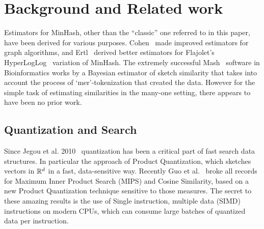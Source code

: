
\section{Background and Related work}

Estimators for MinHash, other than the ``classic'' one referred to in this paper, have been derived for various purposes.
Cohen~\cite{DBLP:reference/algo/Cohen16b} made improved estimators for graph algorithms,
and Ertl~\cite{DBLP:journals/corr/Ertl17} derived better estimators for Flajolet's HyperLogLog~\cite{flajolet1985probabilistic} variation of MinHash.
%
The extremely successful Mash~\cite{ondov2016mash} software in Bioinformatics works by
a Bayesian estimator of sketch similarity that takes into account the process of `mer'-tokenization that created the data.
However for the simple task of estimating similarities in the many-one setting, there appears to have been no prior work.






\subsection{Quantization and Search}

Since Jegou et al. 2010~\cite{jegou2010product} quantization has been a critical part of fast search data structures.
In particular the approach of Product Quantization, which sketches vectors in $\mathbb{R}^d$ in a fast, data-sensitive way.
Recently Guo et al.~\cite{guo2020accelerating} broke all records~\cite{aumuller2017ann} for Maximum Inner Product Search (MIPS) and Cosine Similarity, based on a new Product Quantization technique sensitive to those measures.
The secret to these amazing results is the use of Single instruction, multiple data (SIMD) instructions on modern CPUs, which can consume large batches of quantized data per instruction.


